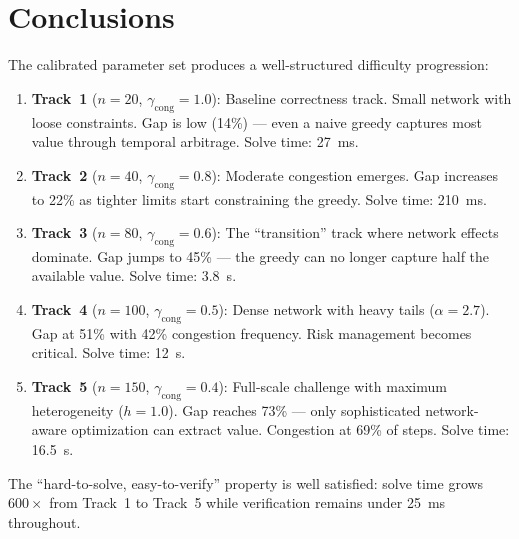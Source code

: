 \documentclass[11pt,a4paper]{article}
\begin{document}
\section{Conclusions}

The calibrated parameter set produces a well-structured difficulty progression:

\begin{enumerate}
    \item \textbf{Track~1} ($n=20$, $\gamma_{\mathrm{cong}}=1.0$): Baseline correctness track. Small network with loose constraints. Gap is low (14\%) --- even a naive greedy captures most value through temporal arbitrage. Solve time: 27~ms.

    \item \textbf{Track~2} ($n=40$, $\gamma_{\mathrm{cong}}=0.8$): Moderate congestion emerges. Gap increases to 22\% as tighter limits start constraining the greedy. Solve time: 210~ms.

    \item \textbf{Track~3} ($n=80$, $\gamma_{\mathrm{cong}}=0.6$): The ``transition'' track where network effects dominate. Gap jumps to 45\% --- the greedy can no longer capture half the available value. Solve time: 3.8~s.

    \item \textbf{Track~4} ($n=100$, $\gamma_{\mathrm{cong}}=0.5$): Dense network with heavy tails ($\alpha=2.7$). Gap at 51\% with 42\% congestion frequency. Risk management becomes critical. Solve time: 12~s.

    \item \textbf{Track~5} ($n=150$, $\gamma_{\mathrm{cong}}=0.4$): Full-scale challenge with maximum heterogeneity ($h=1.0$). Gap reaches 73\% --- only sophisticated network-aware optimization can extract value. Congestion at 69\% of steps. Solve time: 16.5~s.
\end{enumerate}

The ``hard-to-solve, easy-to-verify'' property is well satisfied: solve time grows $600\times$ from Track~1 to Track~5 while verification remains under 25~ms throughout.
\end{document}
